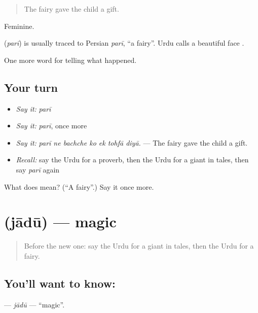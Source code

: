 \begin{quote}
The fairy gave the child a gift.
\end{quote}

Feminine.

\begin{cousinweb}
\textbf{} (\emph{parī}) is usually traced to Persian \emph{parī}, \textquotedblleft{}a fairy\textquotedblright{}. Urdu calls a beautiful face \textbf{ }.
\end{cousinweb}

\begin{grammarlens}[title={What you've built}]
One more word for telling what happened.
\end{grammarlens}

\subsection*{Your turn}
\begin{itemize}
\raggedright
  \item \emph{Say it:} \emph{parī}
  \item \emph{Say it:} \emph{parī}, once more
  \item \emph{Say it:} \emph{parī ne bachche ko ek tohfā diyā.} — The fairy gave the child a gift.
  \item \emph{Recall:} say the Urdu for a proverb, then the Urdu for a giant in tales, then say \emph{parī} again
\end{itemize}

\begin{tcolorbox}[breakable,colback=teal!4,colframe=teal!35!black,title={Before you move on}]
What does  mean? (\textquotedblleft{}A fairy\textquotedblright{}.) Say it once more.
\end{tcolorbox}
\section[\texorpdfstring{\ur{جادو} (jādū)}{جادو (jādū)}]{ (jādū) — magic}

\label{lesson:UR-C325-jadu}



\begin{quote}
Before the new one: say the Urdu for a giant in tales, then the Urdu for a fairy.
\end{quote}

\subsection*{You'll want to know: }
\textbf{} — \emph{jādū} — \textquotedblleft{}magic\textquotedblright{}.

